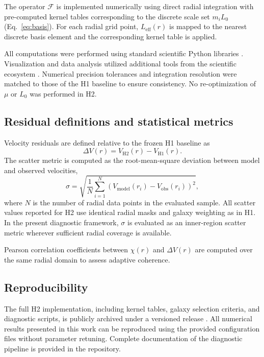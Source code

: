 \documentclass{aa}
\begin{document}
The operator $\mathcal{F}$ is implemented numerically using direct radial
integration with pre-computed kernel tables corresponding to the discrete
scale set $m_i L_0$ (Eq.~\ref{eq:basis}). For each radial grid point,
$L_{\mathrm{eff}}(r)$ is mapped to the nearest discrete basis element and
the corresponding kernel table is applied.

All computations were performed using standard scientific Python libraries
\citep{numpy2020, scipy2020}. Visualization and data analysis utilized
additional tools from the scientific ecosystem \citep{matplotlib2007,
	pandas2010}. Numerical precision tolerances and integration resolution
were matched to those of the H1 baseline to ensure consistency. No
re-optimization of $\mu$ or $L_0$ was performed in H2.

\subsection{Residual definitions and statistical metrics}

Velocity residuals are defined relative to the frozen H1 baseline as
\begin{equation}
	\Delta V(r) = V_{\mathrm{H2}}(r) - V_{\mathrm{H1}}(r).
	\label{eq:deltav}
\end{equation}
The scatter metric is computed as the root-mean-square deviation between model and observed velocities,
\begin{equation}
	\sigma = \sqrt{\frac{1}{N}\sum_{i=1}^{N}
		\left(V_{\mathrm{model}}(r_i) - V_{\mathrm{obs}}(r_i)\right)^2},
	\label{eq:rms}
\end{equation}
where $N$ is the number of radial data points in the evaluated sample.
All scatter values reported for H2 use identical radial masks and galaxy
weighting as in H1. In the present diagnostic framework, $\sigma$ is
evaluated as an inner-region scatter metric wherever sufficient radial
coverage is available.

Pearson correlation coefficients between $\chi(r)$ and $\Delta V(r)$
are computed over the same radial domain to assess adaptive coherence.

\subsection{Reproducibility}

The full H2 implementation, including kernel tables, galaxy selection 
criteria, and diagnostic scripts, is publicly archived under a versioned 
release \citep{h2model2026}. All numerical results presented in this work 
can be reproduced using the provided configuration files without parameter 
retuning. Complete documentation of the diagnostic pipeline is provided 
in the repository.
\end{document}
